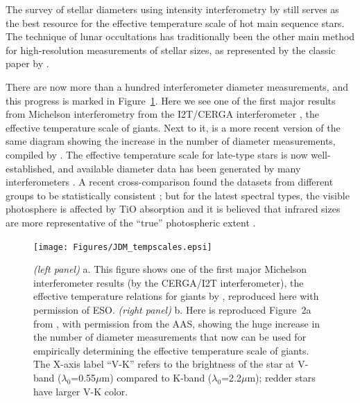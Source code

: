 \documentclass[12pt]{iopart}
\begin{document}
The survey of stellar diameters using intensity interferometry by
\citet{nii1974} still serves as the best resource for the
effective temperature scale of hot main sequence stars.  The technique
of lunar occultations has traditionally been the other main method
for high-resolution measurements of stellar sizes, as represented by
the classic paper by \citet{ridgway1980}.

There are now more than a hundred interferometer diameter
measurements, and this progress is marked in Figure~\ref{tempscales}.
Here we see one of the first major results from Michelson
interferometry from the I2T/CERGA interferometer
\citep{benedetto1987}, the effective temperature scale of giants.
Next to it, is a more recent version of the same diagram showing the
increase in the number of diameter measurements, compiled by
\citet{vanbelle1999}.  The effective temperature scale for late-type
stars is now well-established, and available diameter data has been
generated by many interferometers
\citep[e.g.,][]{mozurk1991,dyck1996a,perrin1998,nordgren1999}.  A
recent cross-comparison found the datasets from different groups to be
statistically consistent \citep{nordgren2001a}; but for
the latest spectral types, the visible photosphere is affected by TiO
absorption and it is believed that infrared sizes are more
representative of the ``true'' photospheric extent
\citep[e.g.,][]{dyck2002}.

\begin{figure}[tbhp]
\begin{center}
\texttt{[image: Figures/JDM\_tempscales.epsi]}
\caption{\footnotesize {\em (left panel)}
  a. This figure shows one of the first major Michelson interferometer
  results (by the CERGA/I2T interferometer), the effective temperature
  relations for giants by \citet[][see their Figure~1]{benedetto1987},
  reproduced here with permission of ESO.  {\em (right panel)} b. Here
  is reproduced Figure~2a from \citet{vanbelle1999}, with permission
  from the AAS, showing the huge increase in the number of diameter
  measurements that now can be used for empirically determining the
  effective temperature scale of giants.  The X-axis label ``V-K''
  refers to the brightness of the star at V-band ($\lambda_0$=0.55$\mu$m)
  compared to K-band ($\lambda_0$=2.2$\mu$m); redder stars have larger
  V-K color.
  \label{tempscales}}
\end{center}
\end{figure}
\end{document}
